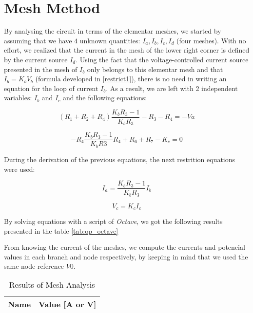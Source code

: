 \section{Mesh Method}

By analysing the circuit in terms of the elementar meshes, we started by assuming that we have $4$ unknown quantities: $I_a, I_b, I_c, I_d$ (four meshes).
With no effort, we realized that the current in the mesh of the lower right corner is defined by the current source $I_d$.
Using the fact that the voltage-controlled current source presented in the mesh of $I_b$ only belongs to this elementar mesh and that $I_b = K_b V_b$ (formula developed in \ref{restrict1}), there is no need in writing an equation for the loop of current $I_b$.
As a result, we are left with 2 independent variables: $I_b$ and $I_c$ and the following equations:


\begin{equation}
  (R_1 + R_2 + R_4) \frac{K_b R_3 -1}{K_b R_3}  - R_3  - R_4 = -Va
  \label{mesh1}
\end{equation}

\begin{equation}
  -R_4 \frac{K_b R_3 - 1}{K_b R3} R_4 + R_6 + R_7 - K_c = 0
  \label{mesh2}
\end{equation}

During the derivation of the previous equations, the next restrition equations were used:

\begin{equation}
  I_a = \frac{K_b R_3 -1}{K_b R_3} I_b
  \label{restrict1}
\end{equation}

\begin{equation}
  V_c = K_c I_c
  \label{restrict2}
\end{equation}

By solving equations with a script of \textit{Octave}, we got the following results presented in the table \ref{tab:op_octave}

From knowing the current of the meshes, we compute the currents and  potencial values in each branch and node respectively, by keeping in mind that we used the same node reference $V0$.


\begin{table}[h]
  \centering
  \begin{tabular}{|l|r|}
    \hline
    {\bf Name} & {\bf Value [A or V]} \\ \hline
    
  \end{tabular}
  \caption{Results of Mesh Analysis}
  \label{tab:op_mesh_tab}
\end{table}




